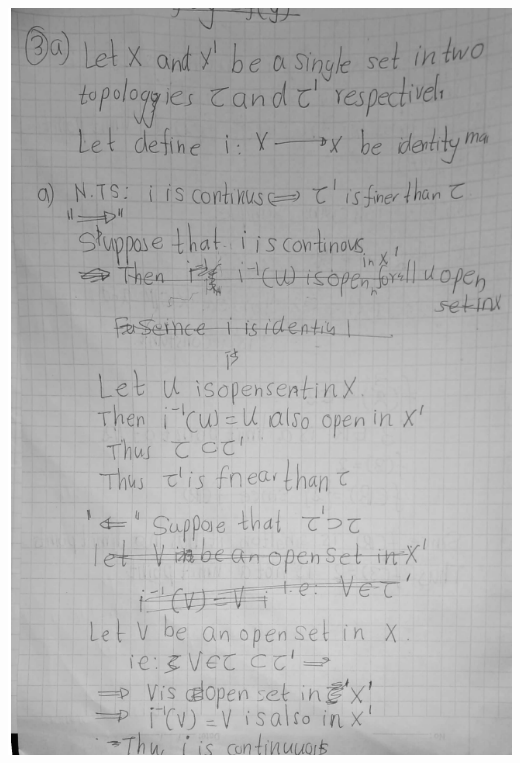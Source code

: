 \documentclass[
]{book}
\theoremstyle{definition}
\theoremstyle{definition}
\theoremstyle{definition}
\theoremstyle{definition}
\theoremstyle{remark}
\begin{document}
\includegraphics{figures/Exercises/Ex 2.18/ex-3-1.png}
\end{document}
